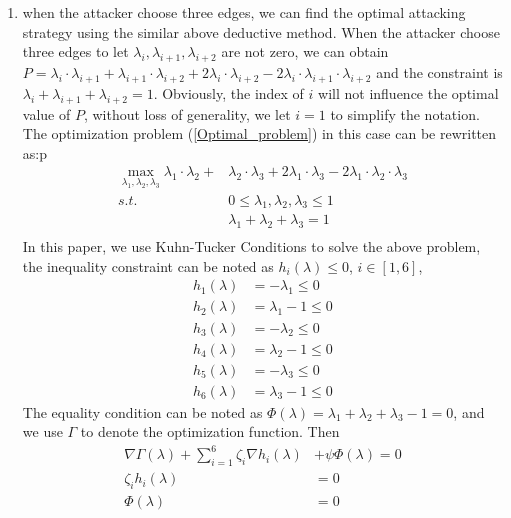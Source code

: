 \documentclass[10pt,journal,compsoc]{IEEEtran}
\begin{document}
\begin{enumerate}
\item when the attacker choose three edges, we can find the optimal attacking strategy using the similar above deductive method. When the attacker choose three edges to let $\lambda_{i},\lambda_{i+1},\lambda_{i+2}$ are not zero, we can obtain $P = \lambda_{i}\cdot\lambda_{i+1}+\lambda_{i+1}\cdot\lambda_{i+2}+2\lambda_{i}\cdot\lambda_{i+2}-2\lambda_{i}\cdot\lambda_{i+1}\cdot\lambda_{i+2}$ and the constraint is $\lambda_{i}+\lambda_{i+1}+\lambda_{i+2} = 1$.
Obviously, the index of $i$ will not influence the optimal value of $P$, without loss of generality, we let $i=1$ to simplify the notation. The optimization problem (\ref{Optimal_problem}) in this case can be rewritten as:p
\begin{equation}
\begin{split}
\max_{\lambda_{1},\lambda_{2},\lambda_{3}}\lambda_{1}\cdot\lambda_{2}+&\lambda_{2}\cdot\lambda_{3}+2\lambda_{1}\cdot\lambda_{3}-2\lambda_{1}\cdot\lambda_{2}\cdot\lambda_{3}\\
s.t. &0\leq\lambda_{1},\lambda_{2},\lambda_{3}\leq1 \\
&\lambda_{1}+\lambda_{2}+\lambda_{3} = 1 \\
\end{split}
\end{equation}
In this paper, we use Kuhn-Tucker Conditions to solve the above problem, the inequality constraint can be noted as $h_{i}(\lambda)\leq0$, $i\in[1,6]$,
\[
\begin{split}
h_{1}(\lambda) &= -\lambda_{1}\leq0\\
h_{2}(\lambda) &= \lambda_{1}-1\leq0\\
h_{3}(\lambda) &= -\lambda_{2}\leq0\\
h_{4}(\lambda) &= \lambda_{2}-1\leq0\\
h_{5}(\lambda) &= -\lambda_{3}\leq0\\
h_{6}(\lambda) &= \lambda_{3}-1\leq0
\end{split}
\]
The equality condition can be noted as $\Phi(\lambda) = \lambda_{1}+\lambda_{2}+\lambda_{3}-1 = 0$, and we use $\Gamma$ to denote the optimization function. Then
\[
\begin{split}
\nabla{\Gamma(\lambda)}+\sum_{i=1}^{6}\zeta_{i}\nabla{h_{i}(\lambda)}&+\psi\Phi(\lambda)=0 \\
\zeta_{i}h_{i}(\lambda) &= 0 \\
\Phi(\lambda) &= 0
\end{split}
\]

\end{enumerate}
\end{document}
